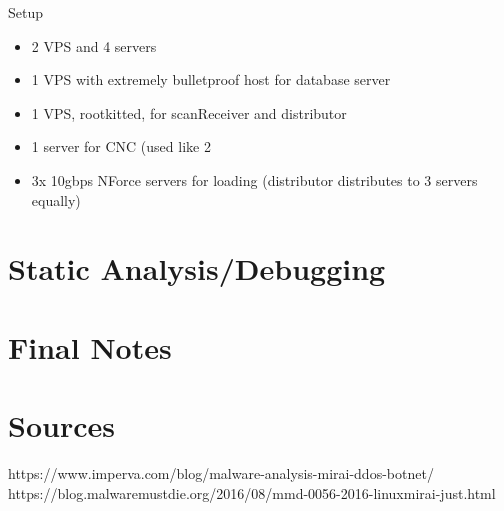 \documentclass[12pt, letterpaper]{article}
\begin{document}
\begin{sloppypar}
\begin{flushleft}
Setup
\begin{itemize}
\item 2 VPS and 4 servers
\item 1 VPS with extremely bulletproof host for database server
\item 1 VPS, rootkitted, for scanReceiver and distributor
\item 1 server for CNC (used like 2%
\item 3x 10gbps NForce servers for loading (distributor distributes to 3 servers equally)
\end{itemize}



\end{flushleft}



\section*{Static Analysis/Debugging}
\begin{flushleft}


\end{flushleft}


\section*{Final Notes}
\begin{flushleft}



\end{flushleft}


\section*{Sources}
\begin{flushleft}
https://www.imperva.com/blog/malware-analysis-mirai-ddos-botnet/
https://blog.malwaremustdie.org/2016/08/mmd-0056-2016-linuxmirai-just.html

\end{flushleft}



\end{sloppypar}
\end{document}
